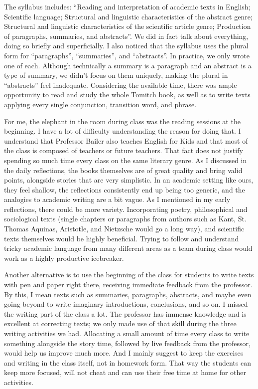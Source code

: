 The syllabus includes: ``Reading and interpretation of academic texts in English; Scientific language; Structural and linguistic characteristics of the abstract genre; Structural and linguistic characteristics of the scientific article genre; Production of paragraphs, summaries, and abstracts''. We did in fact talk about everything, doing so briefly and superficially. I also noticed that the syllabus uses the plural form for ``paragraphs'', ``summaries'', and ``abstracts''. In practice, we only wrote one of each. Although technically a summary is a paragraph and an abstract is a type of summary, we didn't focus on them uniquely, making the plural in ``abstracts'' feel inadequate. Considering the available time, there was ample opportunity to read and study the whole Tomitch book, as well as to write texts applying every single conjunction, transition word, and phrase.

For me, the elephant in the room during class was the reading sessions at the beginning. I have a lot of difficulty understanding the reason for doing that. I understand that Professor Bailer also teaches English for Kids and that most of the class is composed of teachers or future teachers. That fact does not justify spending so much time every class on the same literary genre. As I discussed in the daily reflections, the books themselves are of great quality and bring valid points, alongside stories that are very simplistic. In an academic setting like ours, they feel shallow, the reflections consistently end up being too generic, and the analogies to academic writing are a bit vague. As I mentioned in my early reflections, there could be more variety. Incorporating poetry, philosophical and sociological texts (single chapters or paragraphs from authors such as Kant, St. Thomas Aquinas, Aristotle, and Nietzsche would go a long way), and scientific texts themselves would be highly beneficial. Trying to follow and understand tricky academic language from many different areas as a team during class would work as a highly productive icebreaker.

Another alternative is to use the beginning of the class for students to write texts with pen and paper right there, receiving immediate feedback from the professor. By this, I mean texts such as summaries, paragraphs, abstracts, and maybe even going beyond to write imaginary introductions, conclusions, and so on. I missed the writing part of the class a lot. The professor has immense knowledge and is excellent at correcting texts; we only made use of that skill during the three writing activities we had. Allocating a small amount of time every class to write something alongside the story time, followed by live feedback from the professor, would help us improve much more. And I mainly suggest to keep the exercises and writing in the class itself, not in homework form. That way the students can keep more focused, will not cheat and can use their free time at home for other activities.

